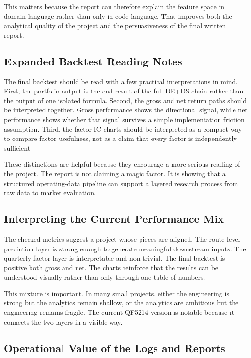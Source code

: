 \documentclass[11pt,a4paper]{article}
\begin{document}
This matters because the report can therefore explain the feature space in
domain language rather than only in code language. That improves both the
analytical quality of the project and the persuasiveness of the final written
report.

\subsection{Expanded Backtest Reading Notes}

The final backtest should be read with a few practical interpretations in mind.
First, the portfolio output is the end result of the full DE+DS chain rather
than the output of one isolated formula. Second, the gross and net return paths
should be interpreted together. Gross performance shows the directional signal,
while net performance shows whether that signal survives a simple implementation
friction assumption. Third, the factor IC charts should be interpreted as a
compact way to compare factor usefulness, not as a claim that every factor is
independently sufficient.

These distinctions are helpful because they encourage a more serious reading of
the project. The report is not claiming a magic factor. It is showing that a
structured operating-data pipeline can support a layered research process from
raw data to market evaluation.

\subsection{Interpreting the Current Performance Mix}

The checked metrics suggest a project whose pieces are aligned. The route-level
prediction layer is strong enough to generate meaningful downstream inputs. The
quarterly factor layer is interpretable and non-trivial. The final backtest is
positive both gross and net. The charts reinforce that the results can be
understood visually rather than only through one table of numbers.

This mixture is important. In many small projects, either the engineering is
strong but the analytics remain shallow, or the analytics are ambitious but the
engineering remains fragile. The current QF5214 version is notable because it
connects the two layers in a visible way.

\subsection{Operational Value of the Logs and Reports}
\end{document}
